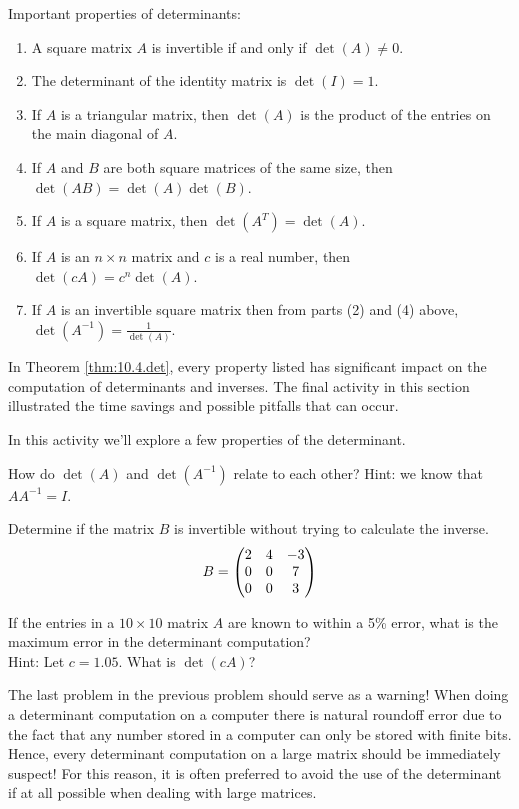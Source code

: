 \begin{thm}
    Important properties of determinants:
    \begin{enumerate}
        \item A square matrix $A$ is invertible if and only if $\det(A) \ne 0$.
        \item The determinant of the identity matrix is $\det(I) = 1$.
        \item If $A$ is a triangular matrix, then $\det(A)$ is the product of the entries
            on the main diagonal of $A$.
        \item If $A$ and $B$ are both square matrices of the same size, then $\det(AB) =
            \det(A) \det(B)$.
        \item If $A$ is a square matrix, then $\det(A^T) = \det(A)$.
        \item If $A$ is an $n \times n$ matrix and $c$ is a real number, then $\det(cA) =
            c^n \det(A)$.
        \item If $A$ is an invertible square matrix then from parts (2) and (4) above,
            $\det(A^{-1}) = \frac{1}{\det(A)}$.
    \end{enumerate}
    \label{thm:10.4.det}
\end{thm}

In Theorem \ref{thm:10.4.det}, every property listed has significant impact on the
computation of determinants and inverses. The final activity in this section illustrated
the time savings and possible pitfalls that can occur.

% 
\begin{problem}
    In this activity we'll explore a few properties of the determinant.
    \ba
        \item How do $\det(A)$ and $\det(A^{-1})$ relate to each other? Hint: we know that
            $AA^{-1} = I$.
        \item Determine if the matrix $B$ is invertible without trying to calculate the
            inverse.
            \[ B = \begin{pmatrix} 2 & 4 & -3 \\ 0 & 0 & 7 \\ 0 & 0 & 3 \end{pmatrix} \]
        \item If the entries in a $10 \times 10$ matrix $A$ are known to within a 5\%
            error, what is the maximum error in the determinant computation? \\ Hint: Let
            $c=1.05$.  What is $\det(cA)$?
    \ea
\end{problem}
% 
The last problem in the previous problem should serve as a warning!  When doing a
determinant computation on a computer there is natural roundoff error due to the fact that
any number stored in a computer can only be stored with finite bits.  Hence, every
determinant computation on a large matrix should be immediately suspect! For this reason,
it is often preferred to avoid the use of the determinant if at all possible when dealing
with large matrices. 


